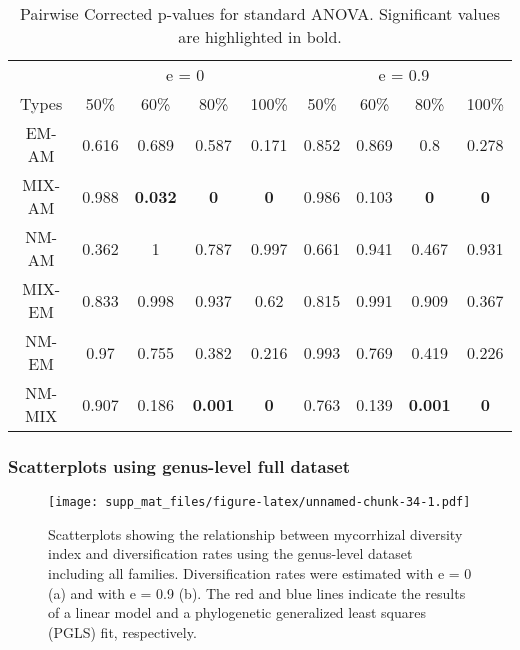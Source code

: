 \documentclass[]{article}
\begin{document}
\begin{table}[H]

\caption{\label{tab:unnamed-chunk-33}Pairwise Corrected p-values for standard ANOVA. Significant values are highlighted in bold.}
\centering
\begin{tabular}{c|c|c|c|c|c|c|c|c}
\hline
\multicolumn{1}{c|}{ } & \multicolumn{4}{c|}{e = 0} & \multicolumn{4}{c}{e = 0.9} \\
\cline{2-5} \cline{6-9}
Types & 50\% & 60\% & 80\% & 100\% & 50\% & 60\% & 80\% & 100\%\\
\hline
EM-AM & 0.616 & 0.689 & 0.587 & 0.171 & 0.852 & 0.869 & 0.8 & 0.278\\
\hline
MIX-AM & 0.988 & \textbf{0.032} & \textbf{0} & \textbf{0} & 0.986 & 0.103 & \textbf{0} & \textbf{0}\\
\hline
NM-AM & 0.362 & 1 & 0.787 & 0.997 & 0.661 & 0.941 & 0.467 & 0.931\\
\hline
MIX-EM & 0.833 & 0.998 & 0.937 & 0.62 & 0.815 & 0.991 & 0.909 & 0.367\\
\hline
NM-EM & 0.97 & 0.755 & 0.382 & 0.216 & 0.993 & 0.769 & 0.419 & 0.226\\
\hline
NM-MIX & 0.907 & 0.186 & \textbf{0.001} & \textbf{0} & 0.763 & 0.139 & \textbf{0.001} & \textbf{0}\\
\hline
\end{tabular}
\end{table}

\hypertarget{scatterplots-using-genus-level-full-dataset}{%
\subsubsection{Scatterplots using genus-level full
dataset}\label{scatterplots-using-genus-level-full-dataset}}

\begin{figure}
\centering
\texttt{[image: supp\_mat\_files/figure-latex/unnamed-chunk-34-1.pdf]}
\caption{Scatterplots showing the relationship between mycorrhizal
diversity index and diversification rates using the genus-level dataset
including all families. Diversification rates were estimated with e = 0
(a) and with e = 0.9 (b). The red and blue lines indicate the results of
a linear model and a phylogenetic generalized least squares (PGLS) fit,
respectively.}
\end{figure}
\end{document}

